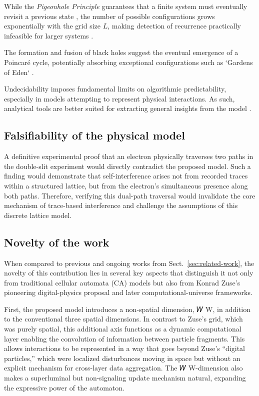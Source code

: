 \documentclass[12pt]{article}
\begin{document}
While the \textit{Pigeonhole Principle} guarantees that a finite system must eventually revisit a previous state \cite{bernstein2007}, the number of possible configurations grows exponentially with the grid size \( L \), making detection of recurrence practically infeasible for larger systems \cite{toffoli1980}.

The formation and fusion of black holes suggest the eventual emergence of a Poincaré cycle, potentially absorbing exceptional configurations such as `Gardens of Eden` \cite{moore1962}.

Undecidability imposes fundamental limits on algorithmic predictability, especially in models attempting to represent physical interactions. As such, analytical tools are better suited for extracting general insights from the model \cite{wolfram}.

\subsection{Falsifiability of the physical model}

A definitive experimental proof that an electron physically traverses two paths in the double-slit experiment would directly contradict the proposed model. Such a finding would demonstrate that self-interference arises not from recorded traces within a structured lattice, but from the electron's simultaneous presence along both paths. Therefore, verifying this dual-path traversal would invalidate the core mechanism of trace-based interference and challenge the assumptions of this discrete lattice model. 

\subsection{Novelty of the work}

When compared to previous and ongoing works from Sect.~\ref{sec:related-work}, the novelty of this contribution lies in several key aspects that distinguish it not only from traditional cellular automata (CA) models but also from Konrad Zuse’s pioneering digital-physics proposal and later computational-universe frameworks.

First, the proposed model introduces a non-spatial dimension, 
𝑊
W, in addition to the conventional three spatial dimensions. In contrast to Zuse’s grid, which was purely spatial, this additional axis functions as a dynamic computational layer enabling the convolution of information between particle fragments. This allows interactions to be represented in a way that goes beyond Zuse’s “digital particles,” which were localized disturbances moving in space but without an explicit mechanism for cross-layer data aggregation. The 
𝑊
W-dimension also makes a superluminal but non-signaling update mechanism natural, expanding the expressive power of the automaton.
\end{document}
